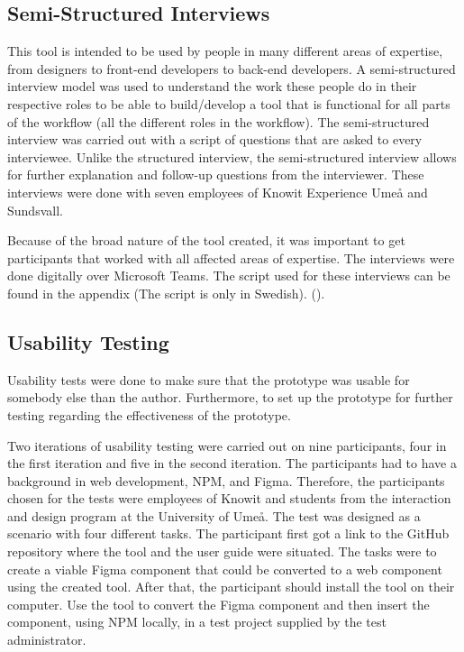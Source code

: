 \subsection{Semi-Structured Interviews}%
\label{sub:inteviews}
This tool is intended to be used by people in many different areas of expertise, from designers to front-end developers to back-end developers. A semi-structured interview model was used \cite{galletta2013mastering} to understand the work these people do in their respective roles to be able to build/develop a tool that is functional for all parts of the workflow (all the different roles in the workflow). The semi-structured interview was carried out with a script of questions that are asked to every interviewee. Unlike the structured interview, the semi-structured interview allows for further explanation and follow-up questions from the interviewer. These interviews were done with seven employees of Knowit Experience Umeå and Sundsvall. 

Because of the broad nature of the tool created, it was important to get participants that worked with all affected areas of expertise. The interviews were done digitally over Microsoft Teams. The script used for these interviews can be found in the appendix (The script is only in Swedish). ().







\subsection{Usability Testing}%
\label{sub:usertesting}
Usability tests were done to make sure that the prototype was usable for somebody else than the author. Furthermore, to set up the prototype for further testing regarding the effectiveness of the prototype.

Two iterations of usability testing were carried out on nine participants, four in the first iteration and five in the second iteration. The participants had to have a background in web development, NPM, and Figma. Therefore, the participants chosen for the tests were employees of Knowit and students from the interaction and design program at the University of Umeå. The test was designed as a scenario with four different tasks. The participant first got a link to the GitHub repository where the tool and the user guide were situated. The tasks were to create a viable Figma component that could be converted to a web component using the created tool. After that, the participant should install the tool on their computer. Use the tool to convert the Figma component and then insert the component, using NPM locally, in a test project supplied by the test administrator.

